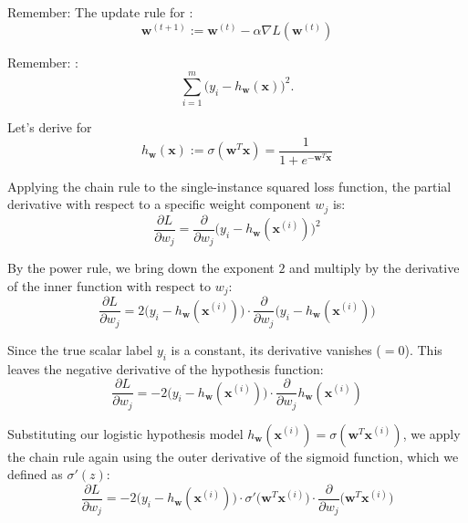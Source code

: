 

Remember: The update rule for :
\[
\mathbf{w}^{(t+1)} := \mathbf{w}^{(t)} - \alpha \nabla L(\mathbf{w}^{(t)})
\]

Remember: :
\[
\sum_{i=1}^{m} \big(y_i-h_{\mathbf{w}}(\mathbf{x})\big)^2.
\]

Let's derive  for 
\[
h_{\mathbf{w}}(\mathbf{x}) := \sigma(\mathbf{w}^T\mathbf{x}) = \frac{1}{1 + e^{-\mathbf{w}^T\mathbf{x}}}
\]

Applying the chain rule to the single-instance squared loss function, the partial derivative with respect to a specific weight component $w_j$ is:
\[
\frac{\partial L}{\partial w_j} = \frac{\partial}{\partial w_j} \big(y_i - h_{\mathbf{w}}(\mathbf{x}^{(i)})\big)^2
\]

By the power rule, we bring down the exponent $2$ and multiply by the derivative of the inner function with respect to $w_j$:
\[
\frac{\partial L}{\partial w_j} = 2\big(y_i - h_{\mathbf{w}}(\mathbf{x}^{(i)})\big) \cdot \frac{\partial}{\partial w_j}\big(y_i - h_{\mathbf{w}}(\mathbf{x}^{(i)})\big)
\]

Since the true scalar label $y_i$ is a constant, its derivative vanishes ($=0$). This leaves the negative derivative of the hypothesis function:
\[
\frac{\partial L}{\partial w_j} = -2\big(y_i - h_{\mathbf{w}}(\mathbf{x}^{(i)})\big) \cdot \frac{\partial}{\partial w_j} h_{\mathbf{w}}(\mathbf{x}^{(i)})
\]

Substituting our logistic hypothesis model $h_{\mathbf{w}}(\mathbf{x}^{(i)}) = \sigma(\mathbf{w}^T\mathbf{x}^{(i)})$, we apply the chain rule again using the outer derivative of the sigmoid function, which we defined as $\sigma'(z)$:
\[
\frac{\partial L}{\partial w_j} = -2\big(y_i - h_{\mathbf{w}}(\mathbf{x}^{(i)})\big) \cdot \sigma'\big(\mathbf{w}^T\mathbf{x}^{(i)}\big) \cdot \frac{\partial}{\partial w_j}\big(\mathbf{w}^T\mathbf{x}^{(i)}\big)
\]

